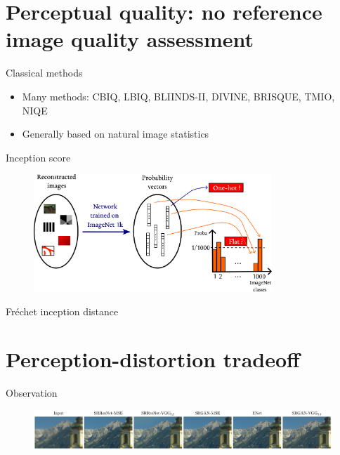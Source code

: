 \documentclass[xcolor=pdftex,dvipsnames,table,mathserif]{beamer}
\begin{document}
\section{Perceptual quality: no reference image quality assessment}

\begin{frame}{Classical methods}

  \begin{itemize}[<+->]
  \item Many methods: CBIQ, LBIQ, BLIINDS-II, DIVINE, BRISQUE, TMIO, NIQE~\cite{mittal_making_2013}
  \item Generally based on natural image statistics
  \end{itemize}


\end{frame}

\begin{frame}{Inception score~\cite{salimans_improved_2016}}

\begin{figure}[ht]
  \centering
  \includegraphics[width=0.8\textwidth]{inception_score}
\end{figure}


\end{frame}



\begin{frame}{Fréchet inception distance~\cite{heusel_gans_2017}}

\end{frame}


\section{Perception-distortion tradeoff}


\begin{frame}{Observation~\cite{blau_perception-distortion_2018}}

  \begin{figure}[ht]
    \centering
    \includegraphics[width=\textwidth]{perception_distortion_tradeoff_illustration}
  \end{figure}

\end{frame}
\end{document}
